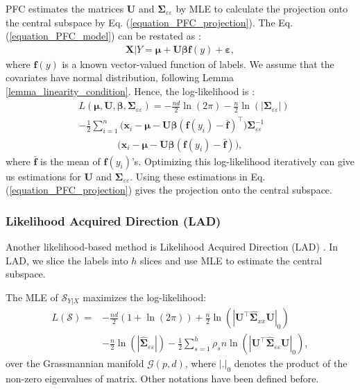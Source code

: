 \documentclass[lang=cn,10pt]{gorgeousnbook}
\numberwithin{equation}{section}%
\numberwithin{figure}{section}%
\begin{document}
PFC estimates the matrices $\boldsymbol{U}$ and $\boldsymbol{\Sigma}_{\varepsilon\varepsilon}$ by MLE to calculate the projection onto the central subspace by Eq. (\ref{equation_PFC_projection}).
The Eq. (\ref{equation_PFC_model}) can be restated as \cite{cook2008principal}:
\begin{align}\label{equation_PFC_model_2}
\boldsymbol{X} | Y = \boldsymbol{\mu} + \boldsymbol{U} \boldsymbol{\beta} \boldsymbol{f}(y) + \boldsymbol{\varepsilon},
\end{align}
where $\boldsymbol{f}(y)$ is a known vector-valued function of labels. 
We assume that the covariates have normal distribution, following Lemma \ref{lemma_linearity_condition}. 
Hence, the log-likelihood is \cite{cook2008principal}:
\begin{align*}
&L(\boldsymbol{\mu}, \boldsymbol{U}, \boldsymbol{\beta}, \boldsymbol{\Sigma}_{\varepsilon\varepsilon}) = -\frac{nd}{2} \ln(2\pi) - \frac{n}{2} \ln(|\boldsymbol{\Sigma}_{\varepsilon\varepsilon}|) \\
&- \frac{1}{2} \sum_{i=1}^n \big(\boldsymbol{x}_i - \boldsymbol{\mu} - \boldsymbol{U} \boldsymbol{\beta}(\boldsymbol{f}(y_i) - \bar{\boldsymbol{f}})^\top\big) \boldsymbol{\Sigma}_{\varepsilon\varepsilon}^{-1} \\
&~~~~~~~~~~~~~~~~~~\big(\boldsymbol{x}_i - \boldsymbol{\mu} - \boldsymbol{U} \boldsymbol{\beta}(\boldsymbol{f}(y_i) - \bar{\boldsymbol{f}})\big),
\end{align*}
where $\bar{\boldsymbol{f}}$ is the mean of $\boldsymbol{f}(y_i)$'s.
Optimizing this log-likelihood iteratively can give us estimations for $\boldsymbol{U}$ and $\boldsymbol{\Sigma}_{\varepsilon\varepsilon}$. Using these estimations in Eq. (\ref{equation_PFC_projection}) gives the projection onto the central subspace. 

\subsubsection{Likelihood Acquired Direction (LAD)}

Another likelihood-based method is Likelihood Acquired Direction (LAD) \cite{cook2009likelihood}. 
In LAD, we slice the labels into $h$ slices and use MLE to estimate the central subspace. 

\begin{theorem}[]
The MLE of $\mathcal{S}_{Y|X}$ maximizes the log-likelihood:
\begin{align*}
L(\mathcal{S}) = &-\frac{nd}{2} (1+\ln(2\pi)) + \frac{n}{2} \ln(|\boldsymbol{U}^\top \widehat{\boldsymbol{\Sigma}}_{xx} \boldsymbol{U}|_0) \\
&- \frac{n}{2} \ln(|\widehat{\boldsymbol{\Sigma}}_{\varepsilon\varepsilon}|) - \frac{1}{2} \sum_{s=1}^h \rho_s n \ln(|\boldsymbol{U}^\top \widehat{\boldsymbol{\Sigma}}_{\varepsilon\varepsilon} \boldsymbol{U}|_0),
\end{align*}
over the Grassmannian manifold $\mathcal{G}(p,d)$, where $|.|_0$ denotes the product of the non-zero eigenvalues of matrix. Other notations have been defined before. 
\end{theorem}
\end{document}
